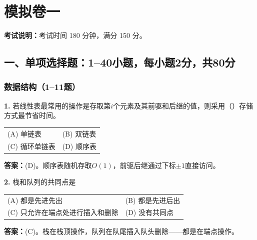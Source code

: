 

\section{模拟卷一}

\noindent\textbf{考试说明：}考试时间 180 分钟，满分 150 分。

\subsection*{一、单项选择题：1--40小题，每小题2分，共80分}

\subsubsection*{数据结构（1--11题）}

\noindent\textbf{1.} 若线性表最常用的操作是存取第$i$个元素及其前驱和后继的值，则采用（\quad）存储方式最节省时间。
\begin{center}
\begin{tabular}{ll}
(A) 单链表 & (B) 双链表 \\[6pt]
(C) 循环单链表 & (D) 顺序表
\end{tabular}
\end{center}

\ifshowsolutions\par\noindent\textbf{答案：}(D)。顺序表随机存取$O(1)$，前驱后继通过下标$\pm1$直接访问。\else \answerarea \fi

\vspace{6pt}

\noindent\textbf{2.} 栈和队列的共同点是
\begin{center}
\begin{tabular}{ll}
(A) 都是先进先出 & (B) 都是先进后出 \\[6pt]
(C) 只允许在端点处进行插入和删除 & (D) 没有共同点
\end{tabular}
\end{center}

\ifshowsolutions\par\noindent\textbf{答案：}(C)。栈在栈顶操作，队列在队尾插入队头删除——都是在端点操作。\else \answerarea \fi

\vspace{6pt}


